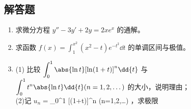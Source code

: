 \subsection{解答题}
\begin{enumerate}
\item 求微分方程 $y''-3y'+2y=2xe^x$ 的通解。
\item 求函数 $\displaystyle f(x)=\int_{1}^{x^2}(x^2-t)e^{-t^2}\dd{t}$ 的单调区间与极值。
\item (1) 比较 $\displaystyle \int_0^1 \abs{\ln t}[\ln (1+t)]^n\dd{t} $ 与  $\displaystyle \int_0^1 t^n \abs{\ln t}\dd{t} (n=1,2,\dots)$ 的大小，说明理由；\\
(2)记 $u_n= $\int_0^1 [\ln (1+t)]^n (n=1,2,\dots)$$ ，求极限  
\end{enumerate}
